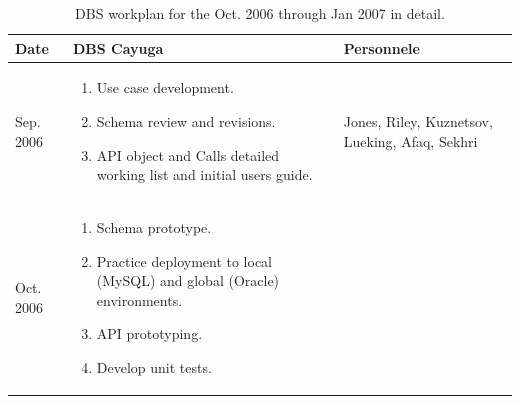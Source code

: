 \documentclass{cmspaper}
\begin{document}
\begin{table}[htb]
    \caption{DBS workplan for the Oct. 2006 through Jan 2007 in detail.  }
    \label{tab:dbs-work-plan}
    \begin{center}
     \begin{tabular}{|l|p{3.5in}|p{1.5in}|} \hline 
Date & DBS Cayuga & Personnele  \\ \hline
Sep. 2006 & 
\begin{enumerate}
 \item Use case development.
 \item Schema review and revisions.
 \item API object and Calls detailed working list and initial users guide.
\end{enumerate} & Jones, Riley, Kuznetsov, Lueking, Afaq, Sekhri   \\ \hline
Oct. 2006  & 
\begin{enumerate}
 \item Schema prototype.
 \item Practice deployment to local (MySQL) and global (Oracle) environments. 
 \item API prototyping.
 \item Develop unit tests. 


\end{enumerate}
\end{tabular}
\end{center}
\end{table}
\end{document}

